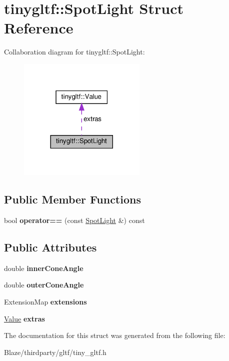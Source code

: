 \hypertarget{structtinygltf_1_1SpotLight}{}\section{tinygltf\+:\+:Spot\+Light Struct Reference}
\label{structtinygltf_1_1SpotLight}


Collaboration diagram for tinygltf\+:\+:Spot\+Light\+:\nopagebreak
\begin{figure}[H]
\begin{center}
\leavevmode
\includegraphics[width=173pt]{structtinygltf_1_1SpotLight__coll__graph}
\end{center}
\end{figure}
\subsection*{Public Member Functions}
\begin{DoxyCompactItemize}
\item 
\mbox{\label{structtinygltf_1_1SpotLight_accb7b477b7b0f34506a878cd8cab1f21}} 
bool {\bfseries operator==} (const \hyperlink{structtinygltf_1_1SpotLight}{Spot\+Light} \&) const
\end{DoxyCompactItemize}
\subsection*{Public Attributes}
\begin{DoxyCompactItemize}
\item 
\mbox{\label{structtinygltf_1_1SpotLight_a3fb1587be9309f9562d2e4ce95d0bb7c}} 
double {\bfseries inner\+Cone\+Angle}
\item 
\mbox{\label{structtinygltf_1_1SpotLight_a965593ea3e9b762983642ba28fa454ff}} 
double {\bfseries outer\+Cone\+Angle}
\item 
\mbox{\label{structtinygltf_1_1SpotLight_acc3425beb4738e6541177f295874faf5}} 
Extension\+Map {\bfseries extensions}
\item 
\mbox{\label{structtinygltf_1_1SpotLight_a31a1efd8282fc42c8f58f37324682dce}} 
\hyperlink{classtinygltf_1_1Value}{Value} {\bfseries extras}
\end{DoxyCompactItemize}


The documentation for this struct was generated from the following file\+:\begin{DoxyCompactItemize}
\item 
Blaze/thirdparty/gltf/tiny\+\_\+gltf.\+h\end{DoxyCompactItemize}
